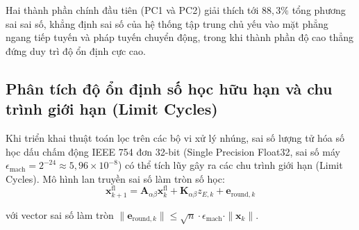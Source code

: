Hai thành phần chính đầu tiên (PC1 và PC2) giải thích tới $88{,}3\%$ tổng phương sai sai số, khẳng định sai số của hệ thống tập trung chủ yếu vào mặt phẳng ngang tiếp tuyến và pháp tuyến chuyển động, trong khi thành phần độ cao thẳng đứng duy trì độ ổn định cực cao.

\subsection{Phân tích độ ổn định số học hữu hạn và chu trình giới hạn (Limit Cycles)}

\hspace{0.5cm} Khi triển khai thuật toán lọc trên các bộ vi xử lý nhúng, sai số lượng tử hóa số học dấu chấm động IEEE 754 đơn 32-bit (Single Precision Float32, sai số máy $\epsilon_{\text{mach}} = 2^{-24} \approx 5{,}96 \times 10^{-8}$) có thể tích lũy gây ra các chu trình giới hạn (Limit Cycles). Mô hình lan truyền sai số làm tròn số học:
\begin{equation}
\mathbf{x}_{k+1}^{\text{fl}} = \mathbf{A}_{\alpha\beta} \mathbf{x}_k^{\text{fl}} + \mathbf{K}_{\alpha\beta} z_{E,k} + \mathbf{e}_{\text{round}, k}
\label{eq:finite-word-length-error-propagation-w15}
\end{equation}

với vector sai số làm tròn $\|\mathbf{e}_{\text{round}, k}\| \le \sqrt{n} \cdot \epsilon_{\text{mach}} \cdot \|\mathbf{x}_k\|$.

\begin{table}[H]
\centering
\caption{Khảo sát lý thuyết sự tích lũy sai số làm tròn số học sau $100.000$ khung đo lường theo mô hình lan truyền sai số lượng tử hóa}
\label{tab:float32-vs-float64-precision-sweep-w15}
\end{table}

